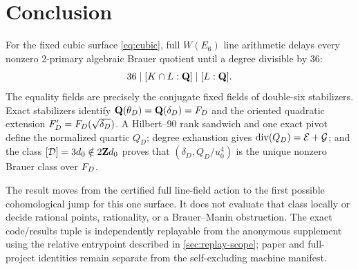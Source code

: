 \section{Conclusion}
\label{sec:conclusion}

For the fixed cubic surface \cref{eq:cubic}, full \(W(E_6)\) line arithmetic
delays every nonzero 2-primary algebraic Brauer quotient until a degree
divisible by \(36\):
\[
 36\mid[K\cap L:\mathbf Q]\mid[L:\mathbf Q].
\]
The equality fields are precisely the conjugate fixed fields of double-six
stabilizers.  Exact stabilizers identify
\(\mathbf Q(\theta_D)=\mathbf Q(\delta_D)=F_D\) and the oriented quadratic extension
\(F_D'=F_D(\sqrt{\delta_D})\).  A Hilbert--90 rank sandwich and one exact
pivot define the normalized quartic \(Q_D\); degree exhaustion gives
\(\operatorname{div}(Q_D)=\mathcal E+\mathcal G\); and the class
\([\mathcal D]=3d_0\notin2\mathbf Z d_0\) proves that
\((\delta_D,Q_D/u_0^4)\) is the unique nonzero Brauer class over \(F_D\).

The result moves from the certified full line-field action to the first
possible cohomological jump for this one surface.  It does not evaluate that
class locally or decide rational points, rationality, or a Brauer--Manin
obstruction.  The exact code/results tuple is independently replayable from
the anonymous supplement using the relative entrypoint described in
\cref{sec:replay-scope}; paper and full-project identities remain separate
from the self-excluding machine manifest.
